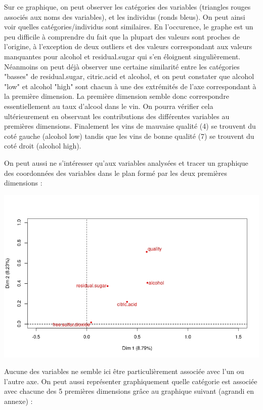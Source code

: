 \documentclass[11pt,a4paper]{article}
\begin{document}
Sur ce graphique, on peut observer les catégories des variables (triangles rouges associés aux noms des variables), et les individus (ronds bleus). On peut ainsi voir quelles catégories/individus sont similaires. En l'occurence, le graphe est un peu difficile à comprendre du fait que la plupart des valeurs sont proches de l'origine, à l'exception de deux outliers et des valeurs correspondant aux valeurs manquantes pour alcohol et residual.sugar qui s'en éloignent singulièrement. Néanmoins on peut déjà observer une certaine similarité entre les catégories "basses" de residual.sugar, citric.acid et alcohol, et on peut constater que alcohol "low" et alcohol "high" sont chacun à une des extrémités de l'axe correspondant à la première dimension. La première dimension semble donc correspondre essentiellement au taux d'alcool dans le vin. On pourra vérifier cela ultérieurement en observant les contributions des différentes variables au premières dimensions. Finalement les vins de mauvaise qualité (4) se trouvent du coté gauche (alcohol low) tandis que les vins de bonne qualité (7) se trouvent du coté droit (alcohol high). \bigskip

On peut aussi ne s'intéresser qu'aux variables analysées et tracer un graphique des coordonnées des variables dans le plan formé par les deux premières dimensions :
\begin{center}
\includegraphics[scale=0.6]{"plot-var-mca"}
\end{center}

Aucune des variables ne semble ici être particulièrement associée avec l'un ou l'autre axe. On peut aussi représenter graphiquement quelle catégorie est associée avec chacune des 5 premières dimensions grâce au graphique suivant  (agrandi en annexe) : 
\end{document}
